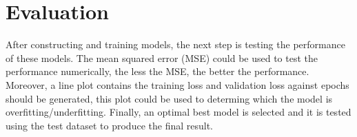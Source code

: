 \documentclass[12pt,twoside]{report}
\begin{document}
\section{Evaluation}
After constructing and training models, the next step is testing the performance of these models. The mean squared error (MSE) could be used to test the performance numerically, the less the MSE, the better the performance. Moreover, a line plot contains the training loss and validation loss against epochs should be generated, this plot could be used to determing which the model is overfitting/underfitting. Finally, an optimal best model is selected and it is tested using the test dataset to produce the final result. 








\end{document}
